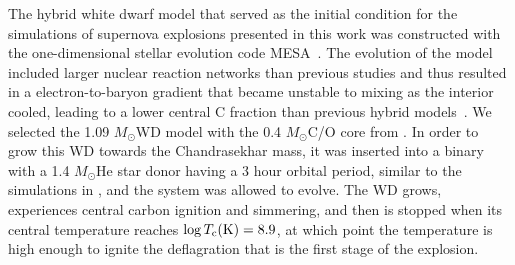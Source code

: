 \documentclass[preprint2]{aastex63}
\newcommand{\unitstyle}[1]{\ensuremath{\mathrm{#1}}}
\newcommand{\Kelvin}{\unitstyle{K}}
\newcommand{\Msun}{\ensuremath{M_\odot}}
\begin{document}
The hybrid white dwarf model that served as the initial condition
for the simulations of supernova explosions presented in this work
was constructed with the one-dimensional stellar evolution code
MESA~\citep{mesa1,mesa2,mesa3,mesa3e}. The evolution of the model 
included larger nuclear reaction networks than previous studies and 
thus resulted in a electron-to-baryon gradient that became unstable 
to mixing as the interior cooled, leading to a lower central C 
fraction than previous hybrid models~\citep{brooksetal2017}. We 
selected the 1.09 \Msun WD model 
with the 0.4 \Msun C/O core from \citep{brooksetal2017}.
In order to grow this WD towards the Chandrasekhar mass, it was inserted into 
a binary with a 1.4 \Msun He star donor having a 3 hour orbital period, similar to 
the simulations in \citet{brooksetal2016},
and the system was
allowed to evolve.  The WD grows, experiences central carbon ignition and 
simmering, and then is stopped when its central temperature reaches 
$\log T_{\rm c}(\Kelvin) = 8.9$, {\color{blue} at which point the 
temperature is high enough to ignite the deflagration that is the first
stage of the explosion.}
\end{document}
